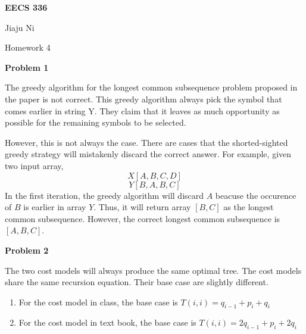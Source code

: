 \documentclass[12pt,letterpaper]{article}
\def\pp{\par\noindent}
\newcommand{\problem}[1]{ \bigskip \pp \textbf{Problem #1}\par}
\begin{document}
\centerline{\bf EECS 336}

\medskip
\centerline{Jiaju Ni}
\centerline{Homework 4}
\bigskip


\problem{1}
The greedy algorithm for the longest common subsequence problem proposed in the paper is not correct. This greedy algorithm always pick the symbol that comes earlier in string Y. They claim that it leaves as much opportunity as possible for the remaining symbols to be selected.\par
However, this is not always the case. There are cases that the shorted-sighted greedy strategy will mistakenly discard the correct answer. For example, given two input array,
\[X[A, B, C, D]\]
\[Y[B, A, B, C]\]
In the first iteration, the greedy algorithm will discard $A$ beacuse the occurence of $B$ is earlier in array $Y$. Thus, it will return array $[B, C]$ as the longest common subsequence. However, the correct longest common subsequence is $[A, B, C]$.

\problem{2}
The two cost models will always produce the same optimal tree. The cost models share the same recursion equation. Their base case are slightly different.
\begin{enumerate}
	\item For the cost model in class, the base case is $T(i,i)=q_{i-1}+p_i+q_i$
	\item For the cost model in text book, the base case is $T(i,i)=2q_{i-1}+p_i+2q_i$
\end{enumerate}
\end{document}
